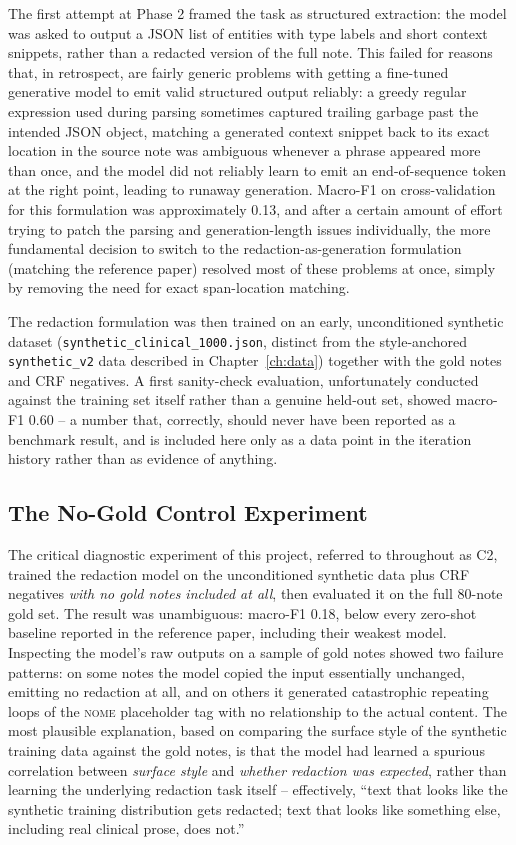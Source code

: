 \documentclass[12pt,a4paper]{report}
\newcommand{\NOME}{\textsc{nome}}
\begin{document}
The first attempt at Phase 2 framed the task as structured extraction: the model was asked to output a JSON list of entities with type labels and short context snippets, rather than a redacted version of the full note. This failed for reasons that, in retrospect, are fairly generic problems with getting a fine-tuned generative model to emit valid structured output reliably: a greedy regular expression used during parsing sometimes captured trailing garbage past the intended JSON object, matching a generated context snippet back to its exact location in the source note was ambiguous whenever a phrase appeared more than once, and the model did not reliably learn to emit an end-of-sequence token at the right point, leading to runaway generation. Macro-F1 on cross-validation for this formulation was approximately 0.13, and after a certain amount of effort trying to patch the parsing and generation-length issues individually, the more fundamental decision to switch to the redaction-as-generation formulation (matching the reference paper) resolved most of these problems at once, simply by removing the need for exact span-location matching.

The redaction formulation was then trained on an early, unconditioned synthetic dataset (\texttt{synthetic\_clinical\_1000.json}, distinct from the style-anchored \texttt{synthetic\_v2} data described in Chapter~\ref{ch:data}) together with the gold notes and CRF negatives. A first sanity-check evaluation, unfortunately conducted against the training set itself rather than a genuine held-out set, showed macro-F1 0.60 -- a number that, correctly, should never have been reported as a benchmark result, and is included here only as a data point in the iteration history rather than as evidence of anything.

\subsection{The No-Gold Control Experiment}
\label{sec:no-gold-control}

The critical diagnostic experiment of this project, referred to throughout as C2, trained the redaction model on the unconditioned synthetic data plus CRF negatives \emph{with no gold notes included at all}, then evaluated it on the full 80-note gold set. The result was unambiguous: macro-F1 0.18, below every zero-shot baseline reported in the reference paper, including their weakest model. Inspecting the model's raw outputs on a sample of gold notes showed two failure patterns: on some notes the model copied the input essentially unchanged, emitting no redaction at all, and on others it generated catastrophic repeating loops of the \NOME{} placeholder tag with no relationship to the actual content. The most plausible explanation, based on comparing the surface style of the synthetic training data against the gold notes, is that the model had learned a spurious correlation between \emph{surface style} and \emph{whether redaction was expected}, rather than learning the underlying redaction task itself -- effectively, ``text that looks like the synthetic training distribution gets redacted; text that looks like something else, including real clinical prose, does not.''
\end{document}
